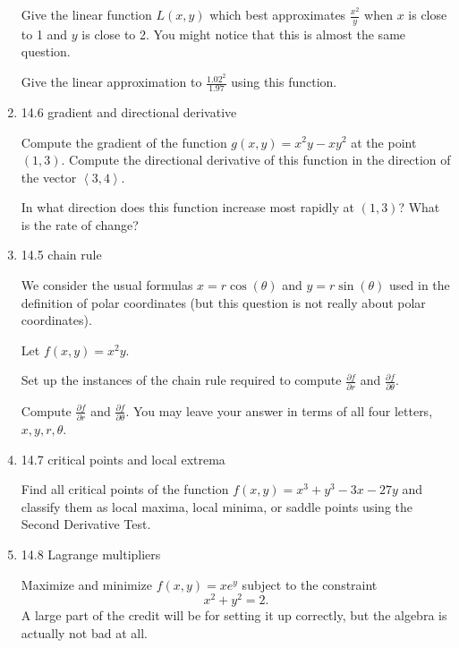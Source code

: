 \documentclass[12pt]{article}
\begin{document}
\begin{enumerate}
\vspace{1.5 in}

Give the linear function $L(x,y)$ which best approximates $\frac{x^2}y$ when $x$ is close to 1 and $y$ is close to 2.  You might notice that this is almost the same question.


\vspace{1.5 in}

Give the linear approximation to $\frac{1.02^2}{1.97}$ using this function.

\newpage

\item  14.6 gradient and directional derivative

Compute the gradient of the function $g(x,y) = x^2y-xy^2$ at the point $(1,3)$.  Compute the directional derivative of this function in the direction of the vector $\left<3,4\right>$.

\vspace{1.5 in}

In what direction does this function increase most rapidly at $(1,3)$?  What is the rate of change?

\newpage

\item  14.5 chain rule

We consider the usual formulas $x=r\cos(\theta)$ and $y=r\sin(\theta)$ used in the definition of polar coordinates (but this question is not really about polar coordinates).

Let $f(x,y) = x^2y$.  

Set up the instances of the chain rule required to compute $\frac{\partial f}{\partial r}$ and $\frac{\partial f}{\partial \theta}$.

Compute  $\frac{\partial f}{\partial r}$ and $\frac{\partial f}{\partial \theta}$.  You may leave your answer in terms of all four letters, $x,y,r,\theta$.

\newpage


\item  14.7  critical points and local extrema

Find all critical points of the function $f(x,y) = x^3+y^3-3x-27y$ and classify them as local maxima, local minima, or saddle points using the Second Derivative Test.


\newpage

\item  14.8  Lagrange multipliers

Maximize and minimize $f(x,y) = xe^y$ subject to the constraint $$x^2+y^2=2.$$  A large part of the credit will be for setting it up correctly, but the algebra is actually not bad at all.


\end{enumerate}
\end{document}
